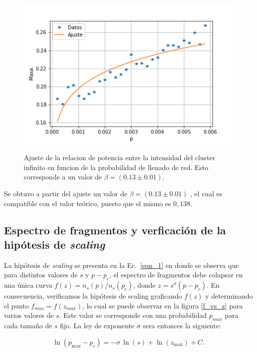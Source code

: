\documentclass[
 reprint,
 amsmath,amssymb,
 aps,
]{revtex4-1}
\begin{document}
\begin{figure}[ht]
\begin{center}
\includegraphics[scale=0.62]{../images/masa_vs_p_fit.png} \\
\caption{Ajuste de la relacion de potencia entre la intensidad del cluster infinito en funcion de la probabilidad de llenado de red. Esto corresponde a un valor de $\beta = (0.13 \pm 0.01)$.}\label{masa_vs_p_fit}
\end{center}
\end{figure}

Se obtuvo a partir del ajuste un valor de $\beta = (0.13 \pm 0.01)$ , el cual es compatible con el valor te\'orico, puesto que el mismo es $0,138$.

\subsection{\label{S} Espectro de fragmentos y verficaci\'on de la hip\'otesis de \emph{scaling} }

La hip\'otesis de \emph{scaling} se presenta en la Ec.~\ref{eqn_1} en donde se observa que para distintos valores de $s$ y $p-p_c$, el espectro de fragmentos debe colapsar en una \'unica curva $f(z)=n_s(p)/n_s(p_c)$, donde $z=s^\sigma(p-p_c)$. En consecuencia, verificamos la hip\'otesis de scaling graficando $f(z)$ y determinando el punto $f_{max} = f(z_{max})$, lo cual se puede observar en la figura \ref{f_vs_z} para varios valores de $s$. Este valor se corresponde con una probabilidad $p_{max}$ para cada tama\~no de $s$ fijo. La ley de exponente $\sigma$ sera entonces la siguiente:

\begin{equation}
\ln(p_\mathrm{max}-p_c)=-\sigma\,\ln(s)+\ln(z_\mathrm{max})+C\label{sigma}.
\end{equation}
\end{document}
